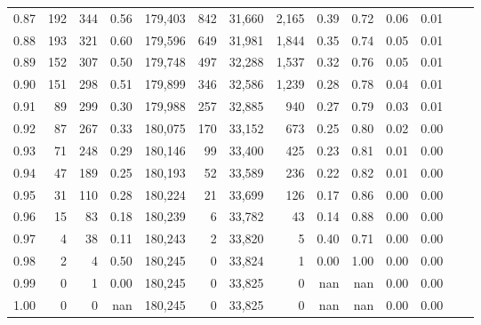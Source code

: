 \begin{tabular}{rrrrrrrrrrrrrr}
0.87 &    192 &  344 &    0.56 &  179,403 &      842 &  31,660 &   2,165 &  0.39 &  0.72 &  0.06 &      0.01 \\
0.88 &    193 &  321 &    0.60 &  179,596 &      649 &  31,981 &   1,844 &  0.35 &  0.74 &  0.05 &      0.01 \\
0.89 &    152 &  307 &    0.50 &  179,748 &      497 &  32,288 &   1,537 &  0.32 &  0.76 &  0.05 &      0.01 \\
0.90 &    151 &  298 &    0.51 &  179,899 &      346 &  32,586 &   1,239 &  0.28 &  0.78 &  0.04 &      0.01 \\
0.91 &     89 &  299 &    0.30 &  179,988 &      257 &  32,885 &     940 &  0.27 &  0.79 &  0.03 &      0.01 \\
0.92 &     87 &  267 &    0.33 &  180,075 &      170 &  33,152 &     673 &  0.25 &  0.80 &  0.02 &      0.00 \\
0.93 &     71 &  248 &    0.29 &  180,146 &       99 &  33,400 &     425 &  0.23 &  0.81 &  0.01 &      0.00 \\
0.94 &     47 &  189 &    0.25 &  180,193 &       52 &  33,589 &     236 &  0.22 &  0.82 &  0.01 &      0.00 \\
0.95 &     31 &  110 &    0.28 &  180,224 &       21 &  33,699 &     126 &  0.17 &  0.86 &  0.00 &      0.00 \\
0.96 &     15 &   83 &    0.18 &  180,239 &        6 &  33,782 &      43 &  0.14 &  0.88 &  0.00 &      0.00 \\
0.97 &      4 &   38 &    0.11 &  180,243 &        2 &  33,820 &       5 &  0.40 &  0.71 &  0.00 &      0.00 \\
0.98 &      2 &    4 &    0.50 &  180,245 &        0 &  33,824 &       1 &  0.00 &  1.00 &  0.00 &      0.00 \\
0.99 &      0 &    1 &    0.00 &  180,245 &        0 &  33,825 &       0 &   nan &   nan &  0.00 &      0.00 \\
1.00 &      0 &    0 &     nan &  180,245 &        0 &  33,825 &       0 &   nan &   nan &  0.00 &      0.00 \\
\bottomrule
\end{tabular}
